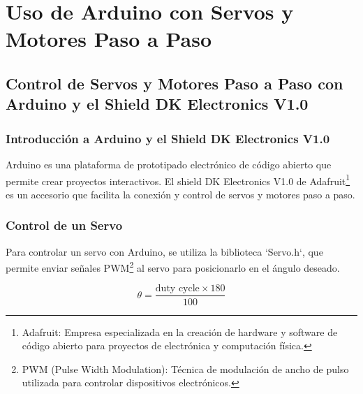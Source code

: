 \documentclass[../main]{subfiles}
\begin{document}
\chapter{Uso de Arduino con Servos y Motores Paso a Paso}

\section{Control de Servos y Motores Paso a Paso con Arduino y el Shield DK Electronics V1.0}

\subsection{Introducción a Arduino y el Shield DK Electronics V1.0}

Arduino es una plataforma de prototipado electrónico de código abierto que permite crear proyectos interactivos. El shield DK Electronics V1.0 de Adafruit\footnote{Adafruit: Empresa especializada en la creación de hardware y software de código abierto para proyectos de electrónica y computación física.} es un accesorio que facilita la conexión y control de servos y motores paso a paso.


\subsection{Control de un Servo}

Para controlar un servo con Arduino, se utiliza la biblioteca `Servo.h`, que permite enviar señales PWM\footnote{PWM (Pulse Width Modulation): Técnica de modulación de ancho de pulso utilizada para controlar dispositivos electrónicos.} al servo para posicionarlo en el ángulo deseado.

\begin{equation}
\theta = \dfrac{\text{duty cycle} \times 180}{100}
\end{equation}
\end{document}
